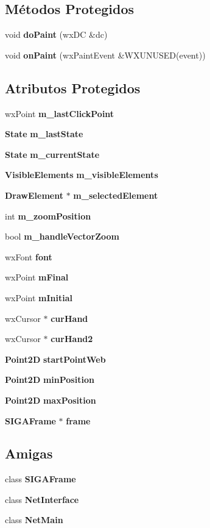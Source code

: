 \subsection*{Métodos Protegidos}
\begin{DoxyCompactItemize}
\item 
void {\bf do\+Paint} (wx\+DC \&dc)
\item 
void {\bf on\+Paint} (wx\+Paint\+Event \&W\+X\+U\+N\+U\+S\+ED(event))
\end{DoxyCompactItemize}
\subsection*{Atributos Protegidos}
\begin{DoxyCompactItemize}
\item 
wx\+Point {\bf m\+\_\+last\+Click\+Point}
\item 
{\bf State} {\bf m\+\_\+last\+State}
\item 
{\bf State} {\bf m\+\_\+current\+State}
\item 
{\bf Visible\+Elements} {\bf m\+\_\+visible\+Elements}
\item 
{\bf Draw\+Element} $\ast$ {\bf m\+\_\+selected\+Element}
\item 
int {\bf m\+\_\+zoom\+Position}
\item 
bool {\bf m\+\_\+handle\+Vector\+Zoom}
\item 
wx\+Font {\bf font}
\item 
wx\+Point {\bf m\+Final}
\item 
wx\+Point {\bf m\+Initial}
\item 
wx\+Cursor $\ast$ {\bf cur\+Hand}
\item 
wx\+Cursor $\ast$ {\bf cur\+Hand2}
\item 
{\bf Point2D} {\bf start\+Point\+Web}
\item 
{\bf Point2D} {\bf min\+Position}
\item 
{\bf Point2D} {\bf max\+Position}
\item 
{\bf S\+I\+G\+A\+Frame} $\ast$ {\bf frame}
\end{DoxyCompactItemize}
\subsection*{Amigas}
\begin{DoxyCompactItemize}
\item 
class {\bf S\+I\+G\+A\+Frame}
\item 
class {\bf Net\+Interface}
\item 
class {\bf Net\+Main}
\end{DoxyCompactItemize}


